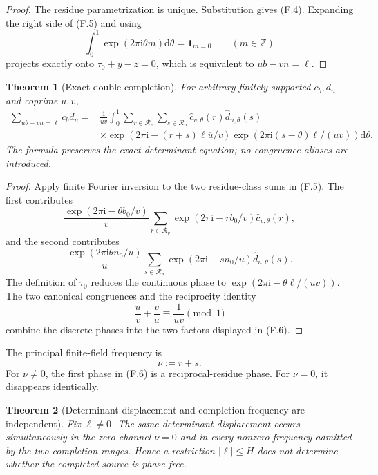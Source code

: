 \documentclass[11pt]{article}
\newtheorem{theorem}{Theorem}[section]
\theoremstyle{definition}
\theoremstyle{remark}
\newcommand{\Z}{\mathbb Z}
\newcommand{\one}{\mathbf 1}
\newcommand{\dd}{\mathrm d}
\newcommand{\ee}[1]{\exp(2\pi\mathrm i #1)}
\begin{document}
\begin{proof}
The residue parametrization is unique.  Substitution gives
\textup{(F.4)}.  Expanding the right side of \textup{(F.5)} and using
\[
 \int_0^1\ee{\theta m}\dd\theta=\one_{m=0}
 \qquad(m\in\Z)
\]
projects exactly onto $\tau_0+y-z=0$, which is equivalent to
$ub-vn=\ell$.
\end{proof}

\begin{theorem}[Exact double completion]
\label{thm:freq-double-completion}
For arbitrary finitely supported $c_b,d_n$ and coprime $u,v$,
\[
 \boxed{
 \begin{aligned}
 \sum_{ub-vn=\ell}c_bd_n
 ={}&\frac1{uv}\int_0^1
 \sum_{r\in\mathcal R_v}\sum_{s\in\mathcal R_u}
 \widehat c_{v,\theta}(r)\widehat d_{u,\theta}(s)\\
 &\times
 \ee{-(r+s)\ell\overline u/v}
 \ee{(s-\theta)\ell/(uv)}\dd\theta.
 \end{aligned}}
 \tag{F.6}
\]
The formula preserves the exact determinant equation; no congruence aliases
are introduced.
\end{theorem}

\begin{proof}
Apply finite Fourier inversion to the two residue-class sums in
\textup{(F.5)}.  The first contributes
\[
 \frac{\ee{-\theta b_0/v}}v
 \sum_{r\in\mathcal R_v}\ee{-rb_0/v}
 \widehat c_{v,\theta}(r),
\]
and the second contributes
\[
 \frac{\ee{\theta n_0/u}}u
 \sum_{s\in\mathcal R_u}\ee{-sn_0/u}
 \widehat d_{u,\theta}(s).
\]
The definition of $\tau_0$ reduces the continuous phase to
$\ee{-\theta\ell/(uv)}$.  The two canonical congruences and the reciprocity
identity
\[
 \frac{\overline u}{v}+\frac{\overline v}{u}
 \equiv\frac1{uv}\pmod1
\]
combine the discrete phases into the two factors displayed in
\textup{(F.6)}.
\end{proof}

The principal finite-field frequency is
\[
 \boxed{\nu:=r+s.}
 \tag{F.7}
\]
For $\nu\ne0$, the first phase in \textup{(F.6)} is a reciprocal-residue
phase.  For $\nu=0$, it disappears identically.

\begin{theorem}[Determinant displacement and completion frequency are independent]
\label{thm:freq-independent-labels}
Fix $\ell\ne0$.  The same determinant displacement occurs simultaneously in
the zero channel $\nu=0$ and in every nonzero frequency admitted by the two
completion ranges.  Hence a restriction $|\ell|\le H$ does not determine
whether the completed source is phase-free.
\end{theorem}
\end{document}
